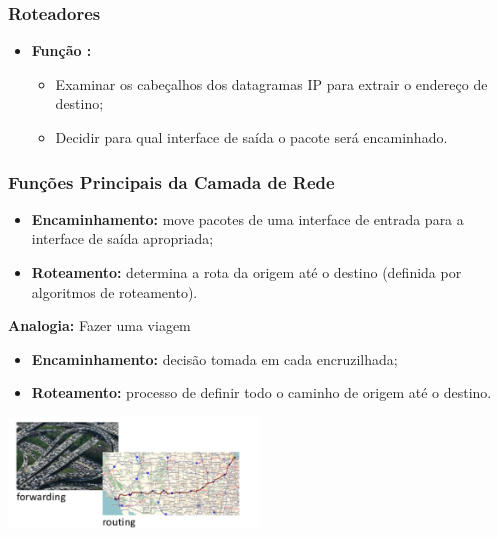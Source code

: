         \subsubsection*{Roteadores}
            \begin{itemize}[left=0.5cm, align=left, nosep]
            
                \item \textbf{Função :}
                \begin{itemize}[left=0.5cm, nosep, label=$\hookrightarrow$]
                    \item Examinar os cabeçalhos dos datagramas IP para extrair o endereço de destino; 
                    \item Decidir para qual interface de saída o pacote será encaminhado.
                \end{itemize} 
                 
            \end{itemize}

        \subsubsection*{Funções Principais da Camada de Rede}
            \begin{itemize}[left=0.5cm, align=left, nosep]
                \item \textbf{Encaminhamento:} move pacotes de uma interface de entrada para a interface de saída apropriada;
                \item \textbf{Roteamento:} determina a rota da origem até o destino (definida por algoritmos de roteamento).
            \end{itemize}

            \textbf{Analogia:} Fazer uma viagem
            \begin{itemize}[left=0.5cm, align=left, nosep]
                \item \textbf{Encaminhamento:} decisão tomada em cada encruzilhada;
                \item \textbf{Roteamento:} processo de definir todo o caminho de origem até o destino.
            \end{itemize}

            \begin{center}
                \includegraphics[width=0.5\textwidth]{img/cap-04/viagem.png}
            \end{center}

